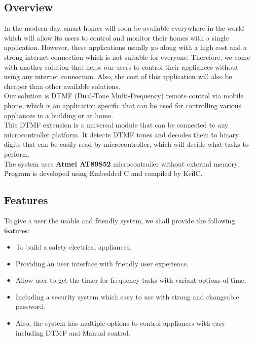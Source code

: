 \documentclass[a4paper]{article}
\begin{document}
\subsection{Overview}
In the modern day, smart homes will soon be available everywhere in the world which will allow its users to control and monitor their homes with a single application. However, these applications usually go along with a high cost and a strong internet connection which is not suitable for everyone. Therefore, we come with another solution that helps our users to control their appliances without using any internet connection. Also, the cost of this application will also be cheaper than other available solutions.\\
Our solution is DTMF (Dual-Tone Multi-Frequency) remote control via mobile phone, which is an application specific that can be used for controlling various appliances in a building or at home.\\
This DTMF extension is a universal module that can be connected to any microcontroller platform. It detects DTMF tones and decodes them to binary digits that can be easily read by microcontroller, which will decide what tasks to perform.\\
The system uses \textbf{Atmel AT89S52} microcontroller without external memory. Program is developed using Embedded C and compiled by KeilC.
\subsection{Features}
To give a user the usable and friendly system, we shall provide the following features:
\begin{itemize}
    \item To build a safety electrical appliances.
    \item Providing an user interface with friendly user experience.
    \item Allow user to get the timer for frequency tasks with variant options of time.
    \item Including a security system which easy to use with strong and changeable password.
    \item Also, the system has multiple options to control appliances with easy including DTMF and Manual control.
\end{itemize}
\end{document}
